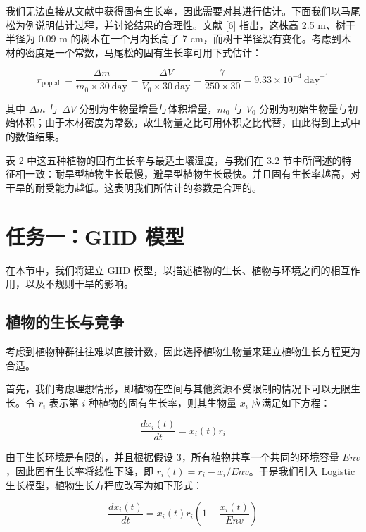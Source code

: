 \documentclass[11pt,a4paper]{ctexart}
\begin{document}
我们无法直接从文献中获得固有生长率，因此需要对其进行估计。下面我们以马尾松为例说明估计过程，并讨论结果的合理性。文献 [6] 指出，这株高 2.5 m、树干半径为 0.09 m 的树木在一个月内长高了 7 cm，而树干半径没有变化。考虑到木材的密度是一个常数，马尾松的固有生长率可用下式估计：

\begin{equation}
r_{\mathrm{pop.al.}}
=\frac{\Delta m}{m_{0}\times 30\ \mathrm{day}}
=\frac{\Delta V}{V_{0}\times 30\ \mathrm{day}}
=\frac{7}{250\times 30}
=9.33\times 10^{-4}\ \mathrm{day}^{-1}
\label{eq:growthrate}
\end{equation}

其中 $\Delta m$ 与 $\Delta V$ 分别为生物量增量与体积增量，$m_0$ 与 $V_0$ 分别为初始生物量与初始体积；由于木材密度为常数，故生物量之比可用体积之比代替，由此得到上式中的数值结果。

表 2 中这五种植物的固有生长率与最适土壤湿度，与我们在 3.2 节中所阐述的特征相一致：耐旱型植物生长最慢，避旱型植物生长最快。并且固有生长率越高，对干旱的耐受能力越低。这表明我们所估计的参数是合理的。

\section{任务一：GIID 模型}

在本节中，我们将建立 GIID 模型，以描述植物的生长、植物与环境之间的相互作用，以及不规则干旱的影响。

\subsection{植物的生长与竞争}

考虑到植物种群往往难以直接计数，因此选择植物生物量来建立植物生长方程更为合适。

首先，我们考虑理想情形，即植物在空间与其他资源不受限制的情况下可以无限生长。令 $r_i$ 表示第 $i$ 种植物的固有生长率，则其生物量 $x_i$ 应满足如下方程：

\begin{equation}
\frac{dx_i(t)}{dt}=x_i(t)r_i
\label{eq:expgrowth}
\end{equation}

由于生长环境是有限的，并且根据假设 3，所有植物共享一个共同的环境容量 $Env$，因此固有生长率将线性下降，即 $r_i(t)=r_i-x_i/Env$。于是我们引入 Logistic 生长模型，植物生长方程应改写为如下形式：

\begin{equation}
\frac{dx_i(t)}{dt}=x_i(t)r_i\left(1-\frac{x_i(t)}{Env}\right)
\label{eq:logistic}
\end{equation}
\end{document}

